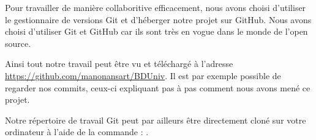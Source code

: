 Pour travailler de manière collaboritive efficacement, nous avons choisi d'utiliser le gestionnaire de versions Git et d'héberger notre projet sur GitHub. Nous avons choisi d'utiliser Git et GitHub car ils sont très en vogue dans le monde de l'open source.

Ainsi tout notre travail peut être vu et téléchargé à l'adresse \url{https://github.com/manonansart/BDUniv}. Il est par exemple possible de regarder nos commits, ceux-ci expliquant pas à pas comment nous avons mené ce projet.

Notre répertoire de travail Git peut par ailleurs être directement cloné sur votre ordinateur à l'aide de la commande : .